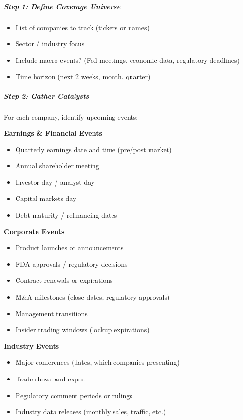 \documentclass[11pt]{article}
\begin{document}
\subparagraph{Step 1: Define Coverage Universe}\mbox{}\par

\begin{itemize}[leftmargin=*,itemsep=2pt,topsep=2pt]
\item {} List of companies to track (tickers or names)
\item {} Sector / industry focus
\item {} Include macro events? (Fed meetings, economic data, regulatory deadlines)
\item {} Time horizon (next 2 weeks, month, quarter)
\end{itemize}

\subparagraph{Step 2: Gather Catalysts}\mbox{}\par

For each company, identify upcoming events:


\textbf{Earnings \& Financial Events}

\begin{itemize}[leftmargin=*,itemsep=2pt,topsep=2pt]
\item {} Quarterly earnings date and time (pre/post market)
\item {} Annual shareholder meeting
\item {} Investor day / analyst day
\item {} Capital markets day
\item {} Debt maturity / refinancing dates
\end{itemize}

\textbf{Corporate Events}

\begin{itemize}[leftmargin=*,itemsep=2pt,topsep=2pt]
\item {} Product launches or announcements
\item {} FDA approvals / regulatory decisions
\item {} Contract renewals or expirations
\item {} M\&A milestones (close dates, regulatory approvals)
\item {} Management transitions
\item {} Insider trading windows (lockup expirations)
\end{itemize}

\textbf{Industry Events}

\begin{itemize}[leftmargin=*,itemsep=2pt,topsep=2pt]
\item {} Major conferences (dates, which companies presenting)
\item {} Trade shows and expos
\item {} Regulatory comment periods or rulings
\item {} Industry data releases (monthly sales, traffic, etc.)
\end{itemize}
\end{document}

